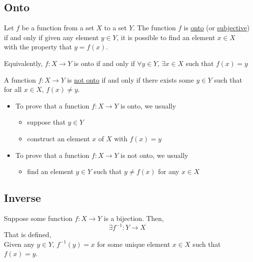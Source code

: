 \subsection{Onto}
\begin{definition}
    Let $f$ be a function from a set $X$ to a set $Y$. The function $f$ is \underline{onto} (or \underline{subjective}) if and only if given any element $y\in Y$, it is possible to find an element $x\in X$ with the property that $y = f(x)$.

    Equivalently, $f:X\rightarrow Y$ is onto if and only if $\forall y\in Y,\,\exists x\in X$ such that $f(x) = y$

    A function $f:X\rightarrow Y$ is \underline{not onto} if and only if there exists some $y\in Y$ such that for all $x\in X$, $f(x)\neq y$.
\end{definition}

\begin{itemize}
    \item To prove that a function $f: X\rightarrow Y$ is onto, we usually \begin{itemize}
        \item suppose that $y\in Y$
        \item construct an element $x$ of $X$ with $f(x) = y$
    \end{itemize}
    \item To prove that a function $f: X\rightarrow Y$ is not onto, we usually \begin{itemize}
        \item find an element $y\in Y$ such that $y \neq f(x)$ for any $x\in X$
    \end{itemize}
\end{itemize}

\newpage
\subsection{Inverse}
\begin{theorm}
    Suppose some function \(f: X\to Y\) is a bijection. Then, \[\exists f^{-1}: Y\to X\]
    That is defined,\\
    Given any \(y\in Y\), \(f^{-1}(y) = x\) for some unique element \(x\in X\) such that \(f(x) = y\). 
\end{theorm}
